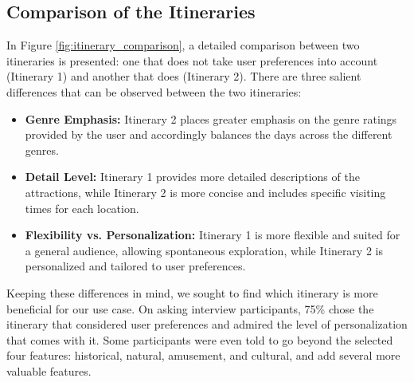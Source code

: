\documentclass[sigconf,authordraft]{acmart}
\begin{document}
\subsection{Comparison of the Itineraries}

In Figure \ref{fig:itinerary_comparison}, a detailed comparison between two itineraries is presented: one that does not take user preferences into account (Itinerary 1) and another that does (Itinerary 2). There are three salient differences that can be observed between the two itineraries:

\begin{itemize}
\item \textbf{Genre Emphasis:} Itinerary 2 places greater emphasis on the genre ratings provided by the user and accordingly balances the days across the different genres.

\item \textbf{Detail Level:} Itinerary 1 provides more detailed descriptions of the attractions, while Itinerary 2 is more concise and includes specific visiting times for each location.

\item \textbf{Flexibility vs. Personalization:} Itinerary 1 is more flexible and suited for a general audience, allowing spontaneous exploration, while Itinerary 2 is personalized and tailored to user preferences.
\end{itemize}

Keeping these differences in mind, we sought to find which itinerary is more beneficial for our use case. On asking interview participants, 75\% chose the itinerary that considered user preferences and admired the level of personalization that comes with it. Some participants were even told to go beyond the selected four features: historical, natural, amusement, and cultural, and add several more valuable features.
\newpage

% 
% 



\end{document}
